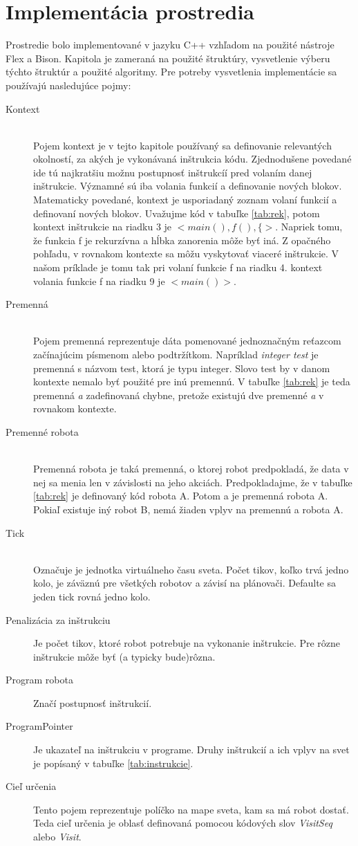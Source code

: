 \chapter{Implementácia prostredia}
Prostredie bolo implementované v jazyku C++ vzhľadom na použité nástroje Flex a Bison. Kapitola je zameraná na použité štruktúry, vysvetlenie výberu týchto štruktúr a použité algoritmy. Pre potreby vysvetlenia implementácie sa používajú nasledujúce pojmy:
\begin{description}
\item[Kontext]\hfill \\
	Pojem kontext je v tejto kapitole používaný sa definovanie relevantých okolností, za akých je vykonávaná inštrukcia kódu. Zjednodušene povedané ide tú najkratšiu možnu postupnosť inštrukcíí pred volaním danej inštrukcie. Významné sú iba volania funkcií a definovanie nových blokov. Matematicky povedané, kontext je usporiadaný zoznam volaní funkcií a definovaní nových blokov. Uvažujme kód v tabuľke \ref{tab:rek}, potom kontext inštrukcie na riadku 3 je $<main(),f(),\{>$. Napriek tomu, že funkcia f je rekurzívna a hĺbka zanorenia môže byť iná. Z opačného pohľadu, v rovnakom kontexte sa môžu vyskytovať viaceré inštrukcie. V našom príklade je tomu tak pri volaní funkcie f na riadku 4. kontext volania  funkcie f na riadku 9 je $<main()>$.
\item[Premenná] \hfill \\
	Pojem premenná reprezentuje dáta pomenované jednoznačným reťazcom začínajúcim písmenom alebo podtržítkom. Napríklad \emph{integer test} je premenná s názvom test, ktorá je typu integer. Slovo test by v danom kontexte nemalo byť použité pre inú premennú. V tabuľke \ref{tab:rek} je teda premenná \emph{a} zadefinovaná chybne, pretože existujú dve premenné \emph{a} v rovnakom kontexte.
\item[Premenné robota]\hfill \\
Premenná robota je taká premenná, o ktorej robot predpokladá, že data v nej sa menia len v závislosti na jeho akciách. Predpokladajme, že v tabuľke \ref{tab:rek} je definovaný kód robota A. Potom a je premenná robota A. Pokiaľ existuje iný robot B, nemá žiaden vplyv na premennú a robota A.
\item [Tick] \hfill \\
	Označuje je jednotka virtuálneho času sveta. Počet tikov, koľko trvá jedno kolo, je záväznú pre všetkých robotov a závisí na plánovači. Defaulte sa jeden tick rovná jedno kolo.
\item[Penalizácia za inštrukciu]
	Je počet tikov, ktoré robot potrebuje na vykonanie inštrukcie. Pre rôzne inštrukcie môže byť (a typicky bude)rôzna.
\item [Program robota]
	Značí postupnosť inštrukcií.
\item [ProgramPointer]
 	Je ukazateľ na inštrukciu v programe. Druhy inštrukcií a ich vplyv na svet je popísaný v tabuľke \ref{tab:instrukcie}.
\item[Cieľ určenia]
	Tento pojem reprezentuje políčko na mape sveta, kam sa má robot dostať. Teda cieľ určenia je oblasť definovaná pomocou kódových slov \emph{VisitSeq} alebo \emph{Visit}.
\end{description}

